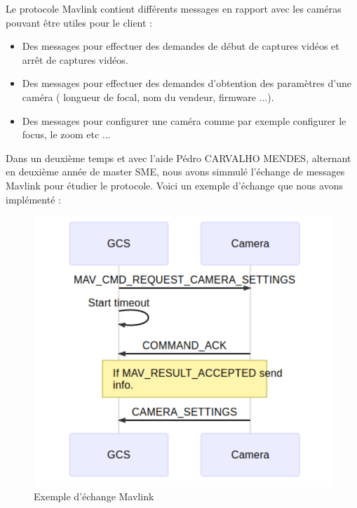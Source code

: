 
Le protocole Mavlink contient différents messages en rapport avec les caméras pouvant être utiles pour le client : 

\begin{itemize}
	\item Des messages pour effectuer des demandes de début de captures vidéos et arrêt de captures vidéos. 
	\item Des messages pour effectuer des demandes d'obtention des paramètres d'une caméra ( longueur de focal, nom du vendeur, firmware ...).
	\item Des messages pour configurer une caméra comme par exemple configurer le focus, le zoom etc ... 
\end{itemize}



Dans un deuxième temps et avec l'aide Pédro CARVALHO MENDES, alternant en deuxième année de master SME,  nous avons simmulé l'échange de messages Mavlink pour étudier le protocole. Voici un exemple d'échange que nous avons implémenté :  
\newpage
\begin{figure}[ht]
    \centering
    \includegraphics[scale=0.35]{img/mavlink_ech.png}
    \caption{Exemple d'échange Mavlink}
    \label{fig:CameraCmdsettings}
\end{figure}

